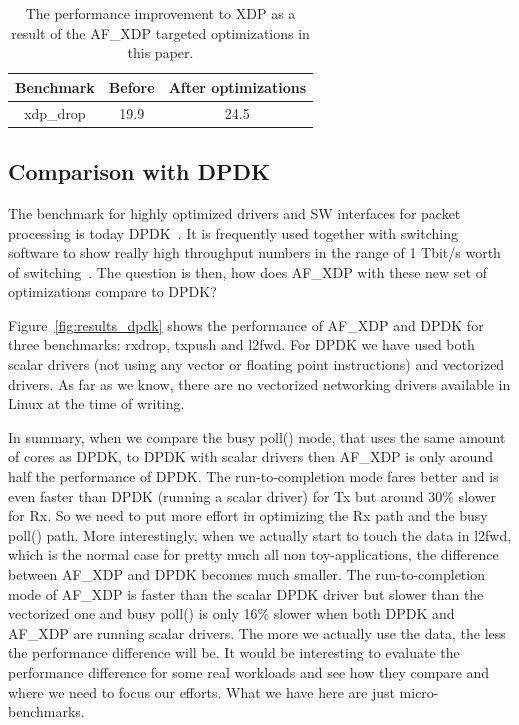 \documentclass[9pt,numbers,reprint]{sigplanconf}
\begin{document}
\begin{table}[ht]
\centering
\begin{tabular}{|c|c|c|} \hline
\textbf{Benchmark} & \textbf{Before} & \textbf{After optimizations} \\ \hline
xdp\_drop & 19.9 & 24.5 \\ \hline
\end{tabular}
\caption{The performance improvement to XDP as a result of the AF\_XDP
  targeted optimizations in this paper.}
\label{table:results_xdp}
\end{table}


\subsection{Comparison with DPDK}
\label{sec:exp:dpdkres}

The benchmark for highly optimized drivers and SW interfaces for
packet processing is today DPDK~\cite{dpdk}. It is frequently used
together with switching software to show really high throughput
numbers in the range of 1 Tbit/s worth of
switching~\cite{fdio_one_tbits}. The question is then, how does
AF\_XDP with these new set of optimizations compare to DPDK?

Figure~\ref{fig:results_dpdk} shows the performance of AF\_XDP and
DPDK for three benchmarks: rxdrop, txpush and l2fwd. For DPDK we have
used both scalar drivers (not using any vector or floating point
instructions) and vectorized drivers. As far as we know, there are no
vectorized networking drivers available in Linux at the time of
writing.

In summary, when we compare the busy poll() mode, that uses the same
amount of cores as DPDK, to DPDK with scalar drivers then AF\_XDP is
only around half the performance of DPDK. The run-to-completion mode
fares better and is even faster than DPDK (running a scalar driver)
for Tx but around 30\% slower for Rx. So we need to put more effort in
optimizing the Rx path and the busy poll() path. More interestingly,
when we actually start to touch the data in l2fwd, which is the normal
case for pretty much all non toy-applications, the difference between
AF\_XDP and DPDK becomes much smaller. The run-to-completion mode of
AF\_XDP is faster than the scalar DPDK driver but slower than the
vectorized one and busy poll() is only 16\% slower when both DPDK and
AF\_XDP are running scalar drivers. The more we actually use the data,
the less the performance difference will be. It would be interesting
to evaluate the performance difference for some real workloads and see
how they compare and where we need to focus our efforts. What we have
here are just micro-benchmarks.
\end{document}
